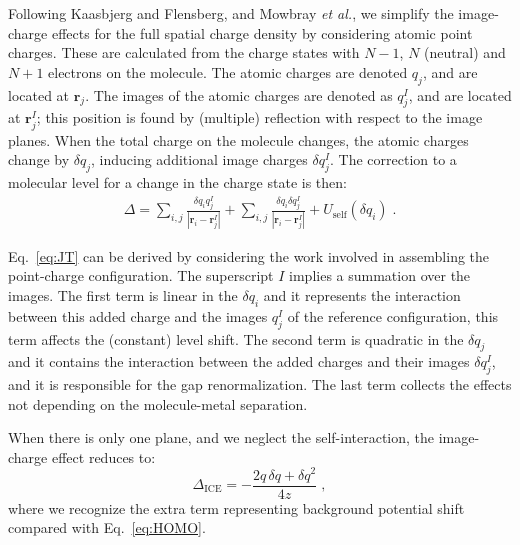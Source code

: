 \documentclass[aip,jcp,a4paper,reprint,floatfix,superscriptaddress]{revtex4-1}
\newcommand{\rijI}{|{\bm r}_i-{\bm r}_{j}^I|}
\newcommand{\etal}{\emph{et al.}\xspace}
\newcommand{\txt}[1]{{\text{#1}}}
\begin{document}
Following Kaasbjerg and Flensberg,\cite{Kaasbjerg2008} and Mowbray \etal\cite{Mowbray2008}, we simplify the image-charge effects for the full spatial charge density by considering atomic point charges.
These are calculated from the charge states with $N-1$, $N$ (neutral) and $N+1$ electrons on the molecule. The atomic charges are denoted $q_j$, and are located at ${\bm r}_j$. The images of the atomic charges are denoted as $q^I_j$, 
and are located at ${\bm r}^I_j$; this position is found by (multiple) reflection with respect to the image planes.%
\cite{Smith1989,Quek2007} When the total charge on the molecule changes, the atomic charges change by $\delta q_j$, inducing additional image charges $\delta q^I_j$. The correction to a molecular level for a change in the charge state is then:
\begin{align}
\label{eq:JT}
\Delta = \sum_{i, j} \frac{\delta q_i q_j^I}{\rijI}
+ \sum_{i,j} \frac{\delta q_i \delta q_j^I}{\rijI} + U_\text{self}(\delta q_i)\;.
\end{align}

Eq.~\eqref{eq:JT} can be derived by considering the work involved in assembling the point-charge configuration.
The superscript $I$ implies a summation over the images. %
The first term is linear in the $\delta q_i$ and it represents the interaction between this added charge and the images $q^I_j$ of the reference configuration, this term affects the (constant) level shift.
The second term is quadratic in the $\delta q_j$ and it contains the interaction between the added charges and their images $\delta q^I_j$, and it is responsible for the gap renormalization. The last term collects the effects not depending on the molecule-metal separation. 

When there is only one plane, and we neglect the self-interaction, the image-charge effect reduces to:
\[
\Delta_\text{ICE} = - \frac{2q\,\delta q + \delta q^2}{4z}\;,
\]
where we recognize the extra term representing background potential shift compared with Eq.~\eqref{eq:HOMO}. %
\end{document}
